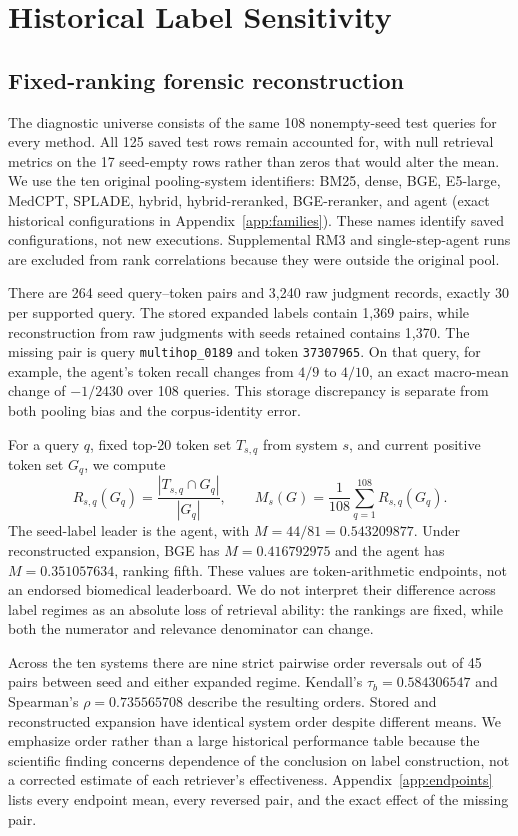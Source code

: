 \section{Historical Label Sensitivity}
\label{sec:labels}
\subsection{Fixed-ranking forensic reconstruction}
The diagnostic universe consists of the same 108 nonempty-seed test queries for every method. All 125 saved test rows remain accounted for, with null retrieval metrics on the 17 seed-empty rows rather than zeros that would alter the mean. We use the ten original pooling-system identifiers: BM25, dense, BGE, E5-large, MedCPT, SPLADE, hybrid, hybrid-reranked, BGE-reranker, and agent (exact historical configurations in Appendix~\ref{app:families}). These names identify saved configurations, not new executions. Supplemental RM3 and single-step-agent runs are excluded from rank correlations because they were outside the original pool.

There are 264 seed query--token pairs and 3,240 raw judgment records, exactly 30 per supported query. The stored expanded labels contain 1,369 pairs, while reconstruction from raw judgments with seeds retained contains 1,370. The missing pair is query \texttt{multihop\_0189} and token \texttt{37307965}. On that query, for example, the agent's token recall changes from $4/9$ to $4/10$, an exact macro-mean change of $-1/2430$ over 108 queries. This storage discrepancy is separate from both pooling bias and the corpus-identity error.

For a query $q$, fixed top-20 token set $T_{s,q}$ from system $s$, and current positive token set $G_q$, we compute
\begin{equation}
 R_{s,q}(G_q)=\frac{|T_{s,q}\cap G_q|}{|G_q|},\qquad
 M_s(G)=\frac{1}{108}\sum_{q=1}^{108}R_{s,q}(G_q).
 \label{eq:recall}
\end{equation}
The seed-label leader is the agent, with $M=44/81=0.543209877$. Under reconstructed expansion, BGE has $M=0.416792975$ and the agent has $M=0.351057634$, ranking fifth. These values are token-arithmetic endpoints, not an endorsed biomedical leaderboard. We do not interpret their difference across label regimes as an absolute loss of retrieval ability: the rankings are fixed, while both the numerator and relevance denominator can change.

Across the ten systems there are nine strict pairwise order reversals out of 45 pairs between seed and either expanded regime. Kendall's $\tau_b=0.584306547$ and Spearman's $\rho=0.735565708$ describe the resulting orders. Stored and reconstructed expansion have identical system order despite different means. We emphasize order rather than a large historical performance table because the scientific finding concerns dependence of the conclusion on label construction, not a corrected estimate of each retriever's effectiveness. Appendix~\ref{app:endpoints} lists every endpoint mean, every reversed pair, and the exact effect of the missing pair.

